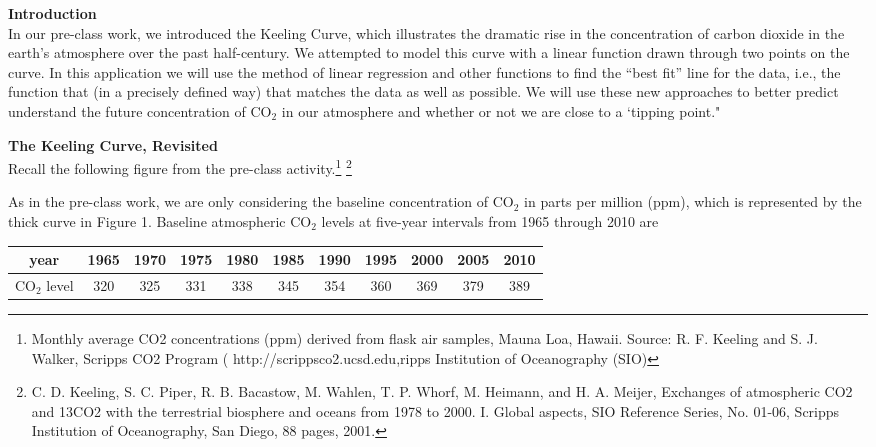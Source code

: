 \documentclass[11pt]{article}
\begin{document}
\pagestyle{otherpages}
\thispagestyle{firstpage}
{\bf Introduction}\\

In our pre-class work, we introduced the Keeling Curve, which illustrates the dramatic rise in the concentration of carbon dioxide in the earth's atmosphere over the past half-century. We  attempted to model this curve with a linear function drawn through two points on the curve. In this application we will use the method of linear regression and other functions  to find the ``best fit'' line for the data, i.e., the  function that (in a precisely defined way) that matches the data as well as possible. We will use these new approaches to better predict  understand  the future concentration of CO$_2$ in our atmosphere and whether or not we are close to a `tipping point."

\vspace{0.5cm}


{\bf The Keeling Curve, Revisited}\\


Recall the following figure from the pre-class activity.\footnote{Monthly average CO2 concentrations (ppm) derived from flask air samples,  Mauna Loa, Hawaii. Source: R. F. Keeling and S. J. Walker, Scripps CO2 Program ( http://scrippsco2.ucsd.edu,ripps Institution of Oceanography (SIO) } 
\footnote{ C. D. Keeling, S. C. Piper, R. B. Bacastow, M. Wahlen, T. P. Whorf, M. Heimann, and   H. A. Meijer, Exchanges of atmospheric CO2 and 13CO2 with the terrestrial biosphere and   oceans from 1978 to 2000.  I. Global aspects, SIO Reference Series, No. 01-06, Scripps   Institution of Oceanography, San Diego, 88 pages, 2001. }\\



\vspace{0.2cm}

As in the pre-class work, we are only considering the baseline concentration of CO$_2$ in parts per million (ppm), which is represented by the thick curve in Figure 1.  Baseline atmospheric CO$_2$ levels at five-year intervals from 1965 through 2010 are
\begin{center}
\begin{tabular}{|c|c|c|c|c|c|c|c|c|c|c|}
\hline
year & 1965 & 1970 & 1975 & 1980 & 1985 & 1990 & 1995 & 2000 & 2005 & 2010 \\
\hline
CO$_2$ level & 320 & 325 & 331 & 338 & 345 & 354 & 360 & 369 & 379 & 389 \\
\hline
\end{tabular}
\end{center}
\end{document}

